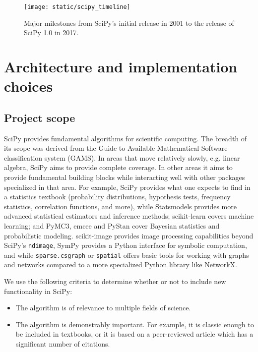 \documentclass[fleqn,10pt]{wlscirep}
\begin{document}
\begin{figure}[H]
\centering
\texttt{[image: static/scipy\_timeline]}
\caption{Major milestones from SciPy's initial release in 2001 to
the release of SciPy 1.0 in 2017.}
\label{fig:timeline}
\end{figure}




\section*{Architecture and implementation choices}
\subsection*{Project scope}

SciPy provides fundamental algorithms for scientific computing. The
breadth of its scope was derived from the Guide to Available Mathematical
Software classification system (GAMS\cite{boisvert1991guide}). In areas
that move relatively slowly, e.g. linear algebra, SciPy aims to provide
complete coverage. In other areas it aims to provide fundamental building
blocks while interacting well with other packages specialized in that area.
For example, SciPy provides what one expects to find in a
statistics textbook (probability distributions, hypothesis tests, frequency
statistics, correlation functions, and more), while
Statsmodels\cite{statsmodels2010} provides
more advanced statistical estimators and inference methods;
scikit-learn\cite{pedregosa2011scikit} covers machine learning; and
PyMC3\cite{10.7717/peerj-cs.55}, emcee\cite{2013PASP-emcee} and
PyStan\cite{pystan-ref} cover Bayesian statistics and probabilistic modeling.
scikit-image\cite{vanderwalt2014scikit} provides image processing
capabilities beyond SciPy's \texttt{ndimage}, SymPy\cite{meurer2017sympy}
provides a Python interface for symbolic computation, and
while \texttt{sparse.csgraph} or \texttt{spatial} offers basic tools
for working with graphs and networks compared to a more specialized
Python library like NetworkX\cite{hagberg2008networkx}.

We use the following criteria to determine whether or not to include new
functionality in SciPy:
\begin{itemize}
    \item The algorithm is of relevance to multiple fields of science.
    \item The algorithm is demonstrably important.  For example, it is classic
    enough to be included in textbooks, or it is based on a peer-reviewed article
    which has a significant number of citations.
\end{itemize}
\end{document}
